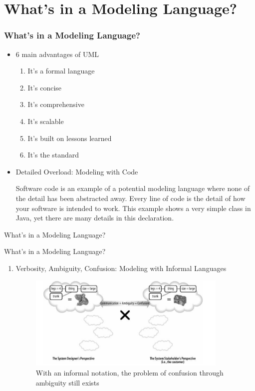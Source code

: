 \documentclass{beamer}
\begin{document}
\section{What’s in a Modeling Language?}
		\begin{frame}
			\frametitle{What’s in a Modeling Language?}
			\begin{itemize}
				\item 6 main advantages of UML
				\begin{enumerate}
					\item It’s a formal language
					\item  It’s concise
					\item It’s comprehensive
					\item It’s scalable
					\item It’s built on lessons learned
					\item It’s the standard
				\end{enumerate}
			\item Detailed Overload: Modeling with Code
				\begin{example}
				Software code is an example of a potential modeling language where none of the detail has been abstracted
				away. Every line of code is the detail of how your software is intended to work. This example shows a very
				simple class in Java, yet there are many details in this declaration.
				\end{example}
			\end{itemize}
		\end{frame}
		\begin{frame}{What’s in a Modeling Language?}
			\begin{example}
			
			\end{example}
	\end{frame}
	\begin{frame}{What’s in a Modeling Language?}
		\begin{enumerate}
		\item Verbosity, Ambiguity, Confusion: Modeling with
			Informal Languages
			\begin{figure}
				\includegraphics[width=0.90\textwidth]{img1}
				\caption{With an informal notation, the problem of confusion \newline through ambiguity still exists}
			\end{figure}
	\end{enumerate}
\end{frame}
\end{document}
